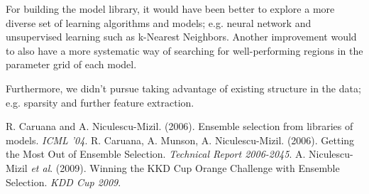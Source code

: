 \documentclass{article}
\renewcommand{\(}{\left(}
\renewcommand{\)}{\right)}
\begin{document}
For building the model library, it would have been better to explore a more diverse set of learning algorithms and models; e.g. neural network and unsupervised learning such as k-Nearest Neighbors. Another improvement would to also have a more systematic way of searching for well-performing regions in the parameter grid of each model. 

Furthermore, we didn't pursue taking advantage of existing structure in the data; e.g. sparsity and further feature extraction. 

\begin{thebibliography}{99}
  R. Caruana and A. Niculescu-Mizil.
  (2006).
  Ensemble selection from libraries of models.
  \emph{ICML '04}.
  R. Caruana, A. Munson, A. Niculescu-Mizil.
  (2006).
  Getting the Most Out of Ensemble Selection.
  \emph{Technical Report 2006-2045}.
  A. Niculescu-Mizil \emph{et al}.
  (2009).
  Winning the KKD Cup Orange Challenge with Ensemble Selection.
  \emph{KDD Cup 2009}.

\end{thebibliography}
\end{document}
